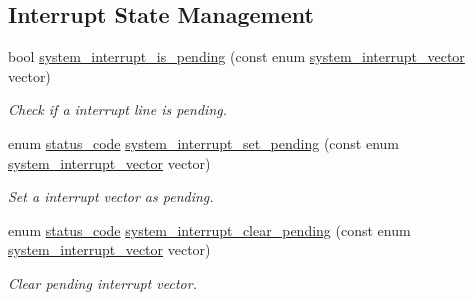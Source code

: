 \subsection*{Interrupt State Management}
\begin{DoxyCompactItemize}
\item 
bool \hyperlink{group__asfdoc__sam0__system__interrupt__group_ga08ea1ee1c7020c64e18a1673ca8548a4}{system\+\_\+interrupt\+\_\+is\+\_\+pending} (const enum \hyperlink{group__asfdoc__sam0__system__interrupt__group_ga43378e6222cc05290c1a0c6a9ba125cf}{system\+\_\+interrupt\+\_\+vector} vector)
\begin{DoxyCompactList}\small\item\em Check if a interrupt line is pending. \end{DoxyCompactList}\item 
enum \hyperlink{group__group__sam0__utils__status__codes_ga751c892e5a46b8e7d282085a5a5bf151}{status\+\_\+code} \hyperlink{group__asfdoc__sam0__system__interrupt__group_ga03184d235f73957b4226205219783ba3}{system\+\_\+interrupt\+\_\+set\+\_\+pending} (const enum \hyperlink{group__asfdoc__sam0__system__interrupt__group_ga43378e6222cc05290c1a0c6a9ba125cf}{system\+\_\+interrupt\+\_\+vector} vector)
\begin{DoxyCompactList}\small\item\em Set a interrupt vector as pending. \end{DoxyCompactList}\item 
enum \hyperlink{group__group__sam0__utils__status__codes_ga751c892e5a46b8e7d282085a5a5bf151}{status\+\_\+code} \hyperlink{group__asfdoc__sam0__system__interrupt__group_ga3c4191c58c9dda28890ec8153d8c83af}{system\+\_\+interrupt\+\_\+clear\+\_\+pending} (const enum \hyperlink{group__asfdoc__sam0__system__interrupt__group_ga43378e6222cc05290c1a0c6a9ba125cf}{system\+\_\+interrupt\+\_\+vector} vector)
\begin{DoxyCompactList}\small\item\em Clear pending interrupt vector. \end{DoxyCompactList}\end{DoxyCompactItemize}
